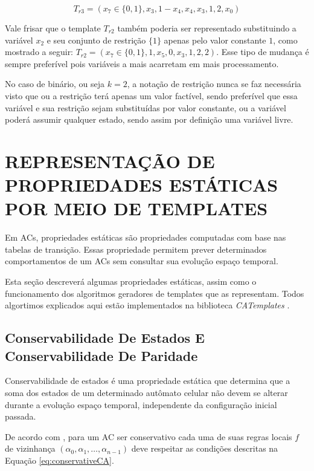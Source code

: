 	\begin{equation}
	T_{r3} = (x_7 \in \{0,1\}, x_3, 1-x_4, x_4, x_3, 1, 2, x_0)
	\label{eq:templateIntescecao}
	\end{equation}

	Vale frisar que o template $T_{r2}$ também poderia ser representado substituindo a variável $x_2$ e seu conjunto de restrição $\{1\}$ apenas pelo valor constante $1$, como mostrado a seguir: $T_{r2} = (x_7 \in \{0,1\}, 1, x_5, 0, x_3, 1, 2, 2)$. Esse tipo de mudança é sempre preferível pois variáveis a mais acarretam em mais processamento.

	No caso de binário, ou seja $k = 2$, a notação de restrição nunca se faz necessária visto que ou a restrição terá apenas um valor factível, sendo preferível que essa variável e sua restrição sejam substituídas por valor constante, ou a variável poderá assumir qualquer estado, sendo assim por definição uma variável livre.





\section{REPRESENTAÇÃO DE PROPRIEDADES ESTÁTICAS POR MEIO DE TEMPLATES}\label{sec:propriedadesEstaticas}

	Em ACs, propriedades estáticas são propriedades computadas com base nas tabelas de transição. Essas propriedade permitem prever determinados comportamentos de um ACs sem consultar sua evolução espaço temporal. 

	Esta seção descreverá algumas propriedades estáticas, assim como o funcionamento dos algoritmos geradores de templates que as representam. Todos algortimos explicados aqui estão implementados na biblioteca \textit{CATemplates} \cite{CATemplates}.

	\subsection{Conservabilidade De Estados E Conservabilidade De Paridade}
	Conservabilidade de estados é uma propriedade estática que determina que a soma dos estados de um determinado autômato celular não devem se alterar durante a evolução espaço temporal, independente da configuração inicial passada.

	De acordo com \cite{boccara2002}, para um AC ser conservativo cada uma de suas regras locais $f$ de vizinhança $(\alpha_0,\alpha_1, \dots, \alpha_{n-1})$ deve respeitar as condições descritas na Equação \ref{eq:conservativeCA}.

